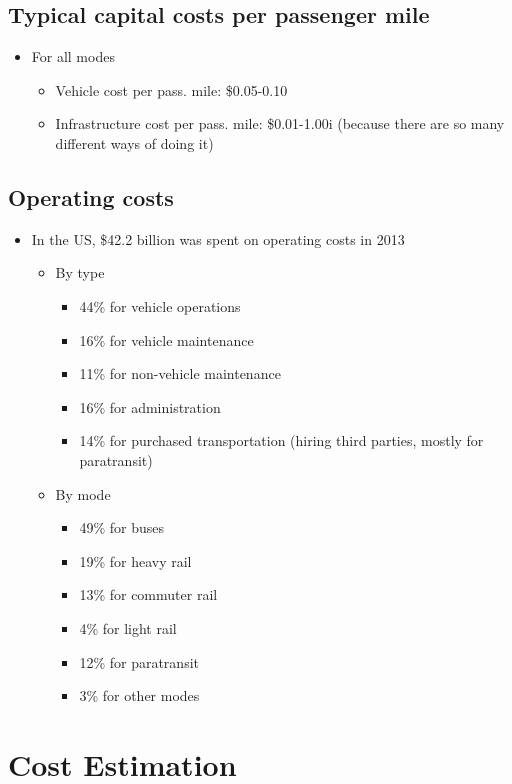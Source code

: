 \documentclass[11pt]{article}
\begin{document}
\subsection{Typical capital costs per passenger mile}
\label{sec:orgcb0c3b2}
\begin{itemize}
\item For all modes
\begin{itemize}
\item Vehicle cost per pass. mile: \$0.05-0.10
\item Infrastructure cost per pass. mile: \$0.01-1.00i (because there are so many different ways of doing it)
\end{itemize}
\end{itemize}
\subsection{Operating costs}
\label{sec:org4f36a35}
\begin{itemize}
\item In the US, \$42.2 billion was spent on operating costs in 2013
\begin{itemize}
\item By type
\begin{itemize}
\item 44\% for vehicle operations
\item 16\% for vehicle maintenance
\item 11\% for non-vehicle maintenance
\item 16\% for administration
\item 14\% for purchased transportation (hiring third parties, mostly for paratransit)
\end{itemize}
\item By mode
\begin{itemize}
\item 49\% for buses
\item 19\% for heavy rail
\item 13\% for commuter rail
\item 4\% for light rail
\item 12\% for paratransit
\item 3\% for other modes
\end{itemize}
\end{itemize}
\end{itemize}
\section{Cost Estimation}
\label{sec:orgc31222b}
\end{document}
